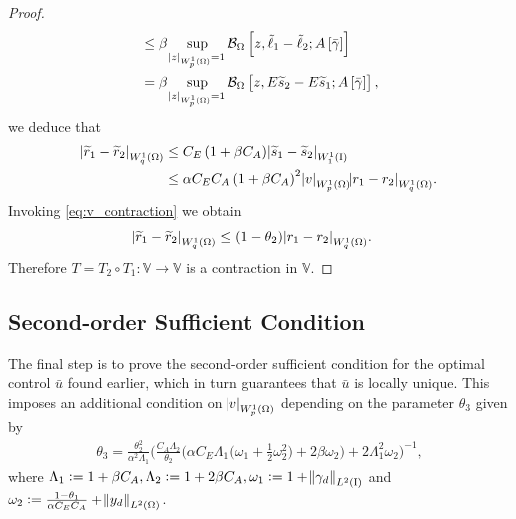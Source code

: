 \documentclass[final]{siamltex}
\begin{document}
\begin{proof}
\begin{align*}
			&\le \beta\sup_{{\abs{{z}}_{{W^{{{1}}}_{{{p}}}\del{{{\Omega}}}}}}=1} 
					{{\mathcal{B}}_\Omega}\sbr{z,\tilde \ell_1 - \tilde \ell_2;A\sbr{\bar{\gamma}}}  \\
			&=   \beta \sup_{{\abs{{z}}_{{W^{{{1}}}_{{{p}}}\del{{{\Omega}}}}}}=1}
					{{\mathcal{B}}_\Omega}\sbr{z,E{\widetilde{s}}_2 - E{\widetilde{s}}_1;A\sbr{\bar{\gamma}}} ,
        \end{align*}		
        we deduce that 			
        \begin{align*}  
             {\abs{{{\widetilde{r}}_1 - {\widetilde{r}}_2}}_{{W^{{{1}}}_{{{q}}}\del{{{\Omega}}}}}} 
			&\leq C_E\del{1 + \beta C_A}{\abs{{{\widetilde{s}}_1 - {\widetilde{s}}_2}}_{{W^{{1}}_{{1}}\del{{\text{\rm I}}}}}} \nonumber \\
			&\leq  \alpha C_EC_A\del{1+\beta C_A}^2{\abs{{v}}_{{W^{{1}}_{{p}}\del{{\Omega}}}}}{\abs{{r_1 - r_2}}_{{W^{{{1}}}_{{{q}}}\del{{{\Omega}}}}}}.
		\end{align*}
	Invoking \eqref{eq:v_contraction} we obtain
		\begin{align*}
			{\abs{{{\widetilde{r}}_1 - {\widetilde{r}}_2}}_{{W^{{{1}}}_{{{q}}}\del{{{\Omega}}}}}} 
			&\leq \del{1-\theta_2}{\abs{{r_1 - r_2}}_{{W^{{{1}}}_{{{q}}}\del{{{\Omega}}}}}}.
		\end{align*}
	Therefore $T = T_2 \circ T_1 : {\mathbb{V}} \rightarrow {\mathbb{V}}$ is a contraction in ${\mathbb{V}}$. 
\end{proof}

\subsection{Second-order Sufficient Condition}
\label{s:oc_rc_second}
The final step is to prove the second-order sufficient condition for the optimal control ${\bar{u}}$ found earlier,
which in turn guarantees that  ${\bar{u}}$ is locally unique. This imposes an additional condition on 
${\abs{{v}}_{{W^{{{1}}}_{{{p}}}\del{{{\Omega}}}}}}$ depending on the parameter $\theta_3$ given by 
\begin{equation}
\begin{aligned} \label{eq:theta_second_order_suff}
 \theta_3 = 
 \frac{\theta_2^2}{\alpha^2\Lambda_1}  
   \Bigg(
	     \frac{C_A\Lambda_2}{\theta_2}
	    \bigg( \alpha C_E\Lambda_1
            \Big( \omega_1+ \frac{1}{2} \omega_2^2
			     \Big)       
	      + 2\beta \omega_2
		 \bigg) 
	     +2 \Lambda_1^2  \omega_2
	\Bigg)^{-1},
\end{aligned}
\end{equation}
where 
$\Lambda_1 := 1 + \beta C_A, \Lambda_2 := 1 + 2\beta C_A, \omega_1 := 1
+ {\norm{{\gamma_d}}_{{L^2\del{{{\text{\rm I}}}}}}}$ and $\omega_2 :=  \frac{1-\theta_1}{\alpha C_E C_A} 
+ {\norm{{y_d}}_{{L^2\del{{{\Omega}}}}}}$.
\end{document}
